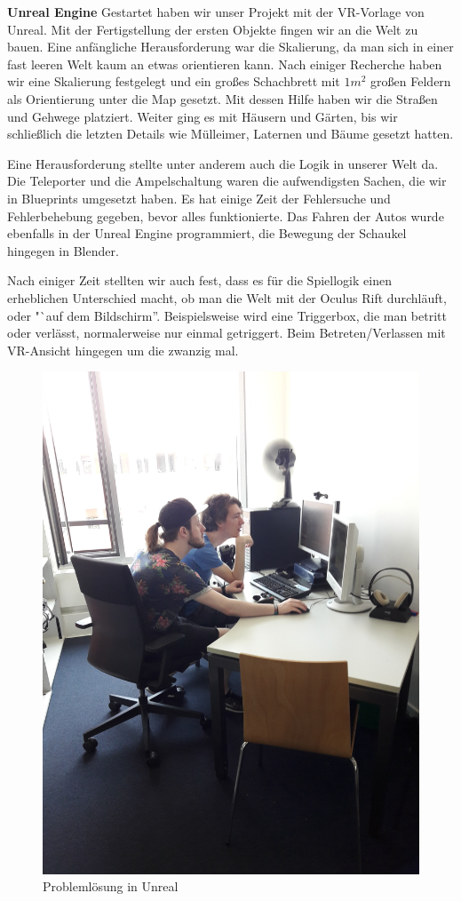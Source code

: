 \documentclass{Bericht}
\begin{document}
	\textbf{Unreal Engine}
			Gestartet haben wir unser Projekt mit der VR-Vorlage von Unreal. Mit der Fertigstellung der ersten Objekte fingen wir an die Welt zu bauen. Eine anfängliche Herausforderung war die Skalierung, da man sich in einer fast leeren Welt kaum an etwas orientieren kann. Nach einiger Recherche haben wir eine Skalierung festgelegt und ein großes Schachbrett mit $1m^{2}$ großen Feldern als Orientierung unter die Map gesetzt. Mit dessen Hilfe haben wir die Straßen und Gehwege platziert. Weiter ging es mit Häusern und Gärten, bis wir schließlich die letzten Details wie Mülleimer, Laternen und Bäume gesetzt hatten. 
			
			Eine Herausforderung stellte unter anderem auch die Logik in unserer Welt da. Die Teleporter und die Ampelschaltung waren die aufwendigsten Sachen, die wir in Blueprints umgesetzt haben. Es hat einige Zeit der Fehlersuche und Fehlerbehebung gegeben, bevor alles funktionierte. Das Fahren der Autos wurde ebenfalls in der Unreal Engine programmiert, die Bewegung der Schaukel hingegen in Blender.
			
			Nach einiger Zeit stellten wir auch fest, dass es für die Spiellogik einen erheblichen Unterschied macht, ob man die Welt mit der Oculus Rift durchläuft, oder "`auf dem Bildschirm''. Beispielsweise wird eine Triggerbox, die man betritt oder verlässt, normalerweise nur einmal getriggert. Beim Betreten/Verlassen mit VR-Ansicht hingegen um die zwanzig mal.
			
		\begin{figure}[!htbp] %
			\centering
			\includegraphics[trim = 200mm 0mm 600mm 0mm, clip, height=\linewidth, width=\textheight, keepaspectratio, angle=270]{../Bilder/20170619_102101.jpg} %
			\caption{Problemlösung in Unreal}
			\label{img:porblemloesung}
		\end{figure}
		
\end{document}
